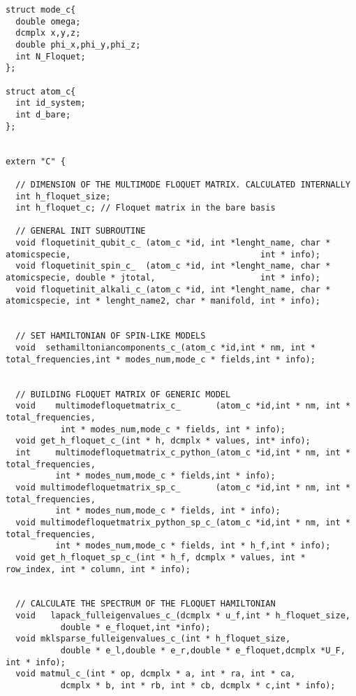 \documentclass[10pt,a4paper]{article}
\begin{document}
\begin{verbatim}
struct mode_c{
  double omega;
  dcmplx x,y,z;
  double phi_x,phi_y,phi_z;
  int N_Floquet;
};

struct atom_c{
  int id_system;
  int d_bare;
};


extern "C" {

  // DIMENSION OF THE MULTIMODE FLOQUET MATRIX. CALCULATED INTERNALLY
  int h_floquet_size;
  int h_floquet_c; // Floquet matrix in the bare basis

  // GENERAL INIT SUBROUTINE
  void floquetinit_qubit_c_ (atom_c *id, int *lenght_name, char * atomicspecie,                                      int * info);
  void floquetinit_spin_c_  (atom_c *id, int *lenght_name, char * atomicspecie, double * jtotal,                     int * info);
  void floquetinit_alkali_c_(atom_c *id, int *lenght_name, char * atomicspecie, int * lenght_name2, char * manifold, int * info);
  
       
  // SET HAMILTONIAN OF SPIN-LIKE MODELS
  void  sethamiltoniancomponents_c_(atom_c *id,int * nm, int * total_frequencies,int * modes_num,mode_c * fields,int * info);
  
  
  // BUILDING FLOQUET MATRIX OF GENERIC MODEL
  void    multimodefloquetmatrix_c_       (atom_c *id,int * nm, int * total_frequencies,
           int * modes_num,mode_c * fields, int * info);
  void get_h_floquet_c_(int * h, dcmplx * values, int* info);
  int     multimodefloquetmatrix_c_python_(atom_c *id,int * nm, int * total_frequencies,
          int * modes_num,mode_c * fields,int * info);
  void multimodefloquetmatrix_sp_c_       (atom_c *id,int * nm, int * total_frequencies,
          int * modes_num,mode_c * fields, int * info);
  void multimodefloquetmatrix_python_sp_c_(atom_c *id,int * nm, int * total_frequencies,
          int * modes_num,mode_c * fields, int * h_f,int * info);
  void get_h_floquet_sp_c_(int * h_f, dcmplx * values, int * row_index, int * column, int * info);

  
  // CALCULATE THE SPECTRUM OF THE FLOQUET HAMILTONIAN
  void   lapack_fulleigenvalues_c_(dcmplx * u_f,int * h_floquet_size,
           double * e_floquet,int *info);
  void mklsparse_fulleigenvalues_c_(int * h_floquet_size,
           double * e_l,double * e_r,double * e_floquet,dcmplx *U_F, int * info);
  void matmul_c_(int * op, dcmplx * a, int * ra, int * ca, 
           dcmplx * b, int * rb, int * cb, dcmplx * c,int * info);
  

\end{verbatim}
\end{document}
